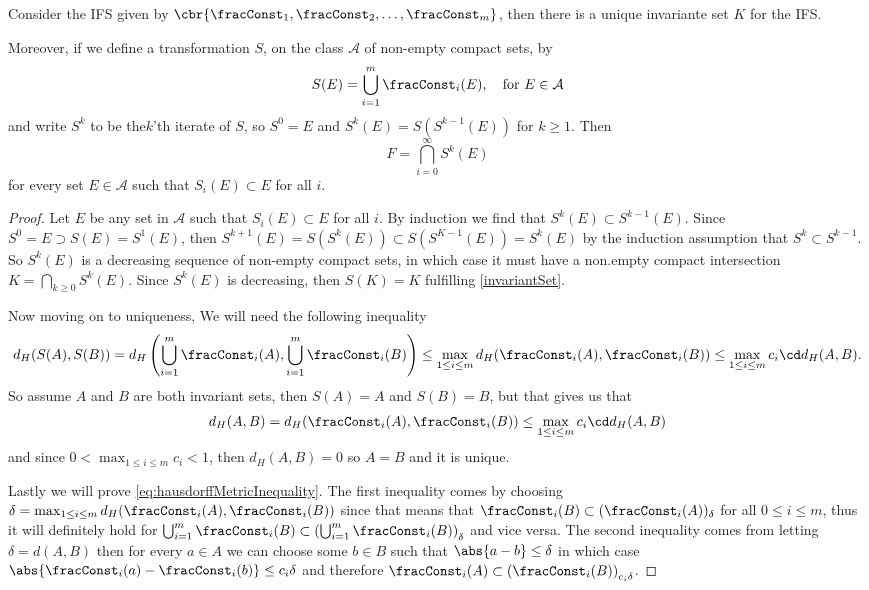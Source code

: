 \begin{theorem}\label{uniqueInvariantSet}
	Consider the IFS given by $\cbr{\fracConst_1, \fracConst_2, \ldots, \fracConst_m}$, then there is a unique invariante set $K$ for the IFS.
	
	Moreover, if we define a transformation $S$, on the class $\mathcal{A}$ of non-empty compact sets, by
	\begin{equation}
		S(E) = \bigcup_{i = 1}^{m} \fracConst_i(E), \quad \text{for } E \in \mathcal{A}
	\end{equation}
	and write $S^k$ to be the$k$'th iterate of $S$, so $S^{0} = E$ and $S^{k}(E) = S(S^{k-1}(E))$ for $k \geq 1$. Then
	\begin{equation}
		F = \bigcap_{i = 0}^{\infty} S^{k}(E)
	\end{equation}
	for every set $E \in \mathcal{A}$ such that $S_i(E) \subset E$ for all $i$.
\end{theorem}

\begin{proof}
	Let $E$ be any set in $\mathcal{A}$ such that $S_i(E) \subset E$ for all $i$. By induction we find that $S^{k}(E) \subset S^{k-1}(E)$. Since
	$S^{0} = E \supset S(E) = S^{1}(E)$, then $S^{k+1}(E) = S(S^{k}(E)) \subset S(S^{K-1}(E)) = S^{k}(E)$ by the induction assumption that $S^{k} \subset S^{k-1}$. So $S^{k}(E)$ is a decreasing sequence of non-empty compact sets, in which case it must have a non.empty compact intersection $K = \bigcap_{k \geq 0} S^{k}(E)$. Since $S^{k}(E)$ is decreasing, then $S(K) = K$ fulfilling \eqref{invariantSet}.
	
	Now moving on to uniqueness, We will need the following inequality
	\begin{equation}\label{eq:hausdorffMetricInequality}
		d_H(S(A), S(B)) = d_H \left(\bigcup_{i = 1}^{m} \fracConst_i(A), \bigcup_{i = 1}^{m} \fracConst_i(B)\right) \leq \max_{1 \leq i \leq m} d_H(\fracConst_i(A), \fracConst_i(B)) \leq \max_{1 \leq i \leq m} c_i \cd d_H(A,B).
	\end{equation}
	So assume $A$ and $B$ are both invariant sets, then $S(A) = A$ and $S(B) = B$, but that gives us that
	\begin{equation}
		d_H(A,B) = d_H(\fracConst_i(A), \fracConst_i(B)) \leq \max_{1 \leq i \leq m} c_i \cd d_H(A,B)
	\end{equation}
	and since $0 < \max_{1 \leq i \leq m}  c_i < 1$, then $d_H(A,B) = 0$ so $A = B$ and it is unique.
	
	Lastly we will prove \eqref{eq:hausdorffMetricInequality}. The first inequality comes by choosing $\delta = \max_{1 \leq i \leq m} d_H(\fracConst_i(A), \fracConst_i(B))$ since that means that $\fracConst_i(B) \subset (\fracConst_i(A))_{\delta}$ for all $0 \leq i \leq m$, thus it will definitely hold for $\bigcup_{i = 1}^{m} \fracConst_i(B) \subset \left(\bigcup_{i = 1}^{m} \fracConst_i(B)\right) _{\delta}$ and vice versa. 
	The second inequality comes from letting $\delta = d(A,B)$ then for every $a \in A$ we can choose some $b \in B$ such that $\abs{a-b} \leq \delta$ in which case $\abs{\fracConst_i(a) -\fracConst_i(b)} \leq c_i \delta$ and therefore $\fracConst_i(A) \subset \left(\fracConst_i(B)\right)_{c_i \delta}$. 
\end{proof}

